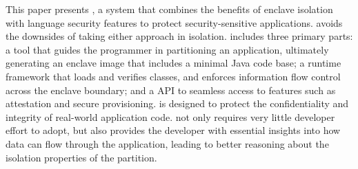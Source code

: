 This paper presents {\em \sysname{}},
a system that combines the benefits of
 \sgx{} enclave isolation with \java{} language security features to protect security-sensitive applications.
\sysname{} avoids the downsides of taking either approach in isolation.
\sysname{} includes three primary parts:
a tool that guides the programmer in partitioning an application, ultimately generating an enclave image that includes
a minimal Java code base;
a runtime framework that loads and verifies classes, and enforces
information flow control across the enclave boundary;
and a \java{} API to seamless access to \sgx{} features such
as attestation and secure provisioning.
\sysname{} is designed to protect the confidentiality and integrity of 
real-world application code. 
\sysname{} not only requires very little developer effort to adopt, but also provides the developer
with essential insights into how data can flow through the application,
leading to better reasoning about the isolation properties of the partition.

